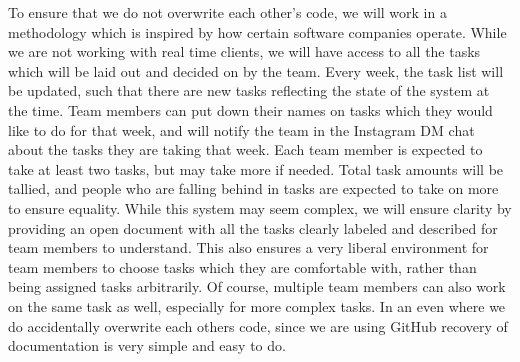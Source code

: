 \documentclass{article} %
\begin{document}
To ensure that we do not overwrite each other's code, we will work in a methodology which is inspired by how certain software companies operate. While we are not working with real time clients, we will have access to all the tasks which will be laid out and decided on by the team. Every week, the task list will be updated, such that there are new tasks reflecting the state of the system at the time. Team members can put down their names on tasks which they would like to do for that week, and will notify the team in the Instagram DM chat about the tasks they are taking that week. Each team member is expected to take at least two tasks, but may take more if needed. Total task amounts will be tallied, and people who are falling behind in tasks are expected to take on more to ensure equality. While this system may seem complex, we will ensure clarity by providing an open document with all the tasks clearly labeled and described for team members to understand. This also ensures a very liberal environment for team members to choose tasks which they are comfortable with, rather than being assigned tasks arbitrarily. Of course, multiple team members can also work on the same task as well, especially for more complex tasks. In an even where we do accidentally overwrite each others code, since we are using GitHub recovery of documentation is very simple and easy to do.
\end{document}
